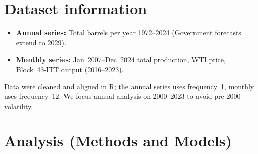 \documentclass[
]{article}
\providecommand{\tightlist}{%
  \setlength{\itemsep}{0pt}\setlength{\parskip}{0pt}}
\begin{document}
\section{Dataset information}\label{dataset-information}

\begin{itemize}
\tightlist
\item
  \textbf{Annual series:} Total barrels per year 1972--2024 (Government
  forecasts extend to 2029).
\item
  \textbf{Monthly series:} Jan~2007--Dec~2024 total production, WTI
  price, Block~43‑ITT output (2016--2023).
\end{itemize}

Data were cleaned and aligned in R; the annual series uses frequency~1,
monthly uses frequency~12. We focus annual analysis on 2000--2023 to
avoid pre‑2000 volatility.

\section{Analysis (Methods and
Models)}\label{analysis-methods-and-models}
\end{document}
